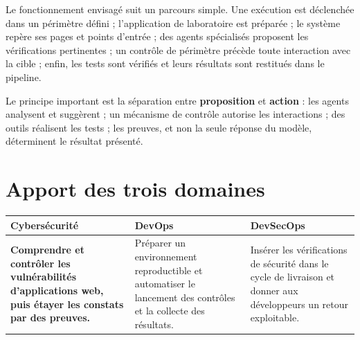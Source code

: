 \documentclass[11pt,a4paper]{article}
\begin{document}
Le fonctionnement envisagé suit un parcours simple. Une exécution est déclenchée dans un périmètre défini ; l'application de laboratoire est préparée ; le système repère ses pages et points d'entrée ; des agents spécialisés proposent les vérifications pertinentes ; un contrôle de périmètre précède toute interaction avec la cible ; enfin, les tests sont vérifiés et leurs résultats sont restitués dans le pipeline.

\begin{center}
\end{center}

Le principe important est la séparation entre \textbf{proposition} et \textbf{action} : les agents analysent et suggèrent ; un mécanisme de contrôle autorise les interactions ; des outils réalisent les tests ; les preuves, et non la seule réponse du modèle, déterminent le résultat présenté.

\section{Apport des trois domaines}

\begin{center}
\begin{tabularx}{\textwidth}{@{}>{\bfseries\color{Blue}}YYY@{}}
\hline
Cybersécurité & DevOps & DevSecOps \\
\hline
Comprendre et contrôler les vulnérabilités d'applications web, puis étayer les constats par des preuves. & Préparer un environnement reproductible et automatiser le lancement des contrôles et la collecte des résultats. & Insérer les vérifications de sécurité dans le cycle de livraison et donner aux développeurs un retour exploitable. \\
\hline
\end{tabularx}
\end{center}
\end{document}
